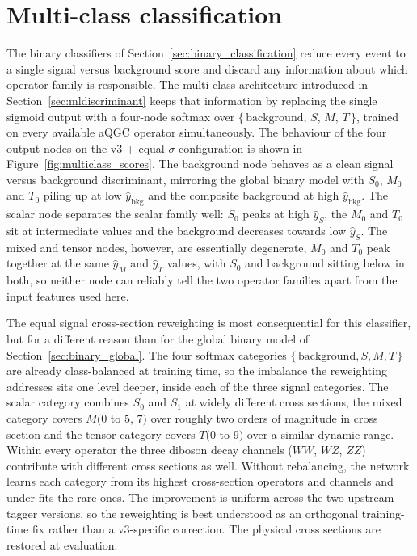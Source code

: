 \section{Multi-class classification}
\label{sec:multiclass_classification}

The binary classifiers of Section~\ref{sec:binary_classification} reduce every event to a single signal versus background score and discard any information about which operator family is responsible. The multi-class architecture introduced in Section~\ref{sec:mldiscriminant} keeps that information by replacing the single sigmoid output with a four-node softmax over $\{\,\mathrm{background},\,S,\,M,\,T\,\}$, trained on every available aQGC operator simultaneously. The behaviour of the four output nodes on the v3 + equal-$\sigma$ configuration is shown in Figure~\ref{fig:multiclass_scores}. The background node behaves as a clean signal versus background discriminant, mirroring the global binary model with $S_0$, $M_0$ and $T_0$ piling up at low $\hat{y}_{\mathrm{bkg}}$ and the composite background at high $\hat{y}_{\mathrm{bkg}}$. The scalar node separates the scalar family well: $S_0$ peaks at high $\hat{y}_S$, the $M_0$ and $T_0$ sit at intermediate values and the background decreases towards low $\hat{y}_S$. The mixed and tensor nodes, however, are essentially degenerate, $M_0$ and $T_0$ peak together at the same $\hat{y}_M$ and $\hat{y}_T$ values, with $S_0$ and background sitting below in both, so neither node can reliably tell the two operator families apart from the input features used here.

The equal signal cross-section reweighting is most consequential for this classifier, but for a different reason than for the global binary model of Section~\ref{sec:binary_global}. The four softmax categories $\{\,\mathrm{background},S,M,T\,\}$ are already class-balanced at training time, so the imbalance the reweighting addresses sits one level deeper, inside each of the three signal categories. The scalar category combines $S_0$ and $S_1$ at widely different cross sections, the mixed category covers $M(0$ to $5,\,7)$ over roughly two orders of magnitude in cross section and the tensor category covers $T(0$ to $9)$ over a similar dynamic range. Within every operator the three diboson decay channels ($WW$, $WZ$, $ZZ$) contribute with different cross sections as well. Without rebalancing, the network learns each category from its highest cross-section operators and channels and under-fits the rare ones. The improvement is uniform across the two upstream tagger versions, so the reweighting is best understood as an orthogonal training-time fix rather than a v3-specific correction. The physical cross sections are restored at evaluation.

